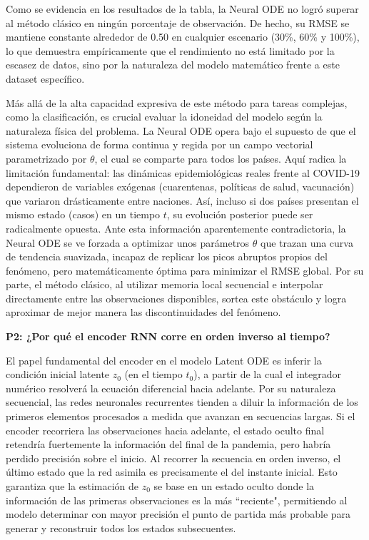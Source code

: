 \documentclass[12pt]{article}
\begin{document}
Como se evidencia en los resultados de la tabla, la Neural ODE no logró superar al método clásico en ningún porcentaje de observación. De hecho, su RMSE se mantiene constante alrededor de 0.50 en cualquier escenario (30\%, 60\% y 100\%), lo que demuestra empíricamente que el rendimiento no está limitado por la escasez de datos, sino por la naturaleza del modelo matemático frente a este dataset específico.

Más allá de la alta capacidad expresiva de este método para tareas complejas, como la clasificación, es crucial evaluar la idoneidad del modelo según la naturaleza física del problema. La Neural ODE opera bajo el supuesto de que el sistema evoluciona de forma continua y regida por un campo vectorial parametrizado por $\theta$, el cual se comparte para todos los países. Aquí radica la limitación fundamental: las dinámicas epidemiológicas reales frente al COVID-19 dependieron de variables exógenas (cuarentenas, políticas de salud, vacunación) que variaron drásticamente entre naciones. Así, incluso si dos países presentan el mismo estado (casos) en un tiempo $t$, su evolución posterior puede ser radicalmente opuesta. Ante esta información aparentemente contradictoria, la Neural ODE se ve forzada a optimizar unos parámetros $\theta$ que trazan una curva de tendencia suavizada, incapaz de replicar los picos abruptos propios del fenómeno, pero matemáticamente óptima para minimizar el RMSE global. Por su parte, el método clásico, al utilizar memoria local secuencial e interpolar directamente entre las observaciones disponibles, sortea este obstáculo y logra aproximar de mejor manera las discontinuidades del fenómeno.

\textbf{P2: ¿Por qué el encoder RNN corre en orden inverso al tiempo?}

El papel fundamental del encoder en el modelo Latent ODE es inferir la condición inicial latente $z_0$ (en el tiempo $t_0$), a partir de la cual el integrador numérico resolverá la ecuación diferencial hacia adelante. Por su naturaleza secuencial, las redes neuronales recurrentes tienden a diluir la información de los primeros elementos procesados a medida que avanzan en secuencias largas. Si el encoder recorriera las observaciones hacia adelante, el estado oculto final retendría fuertemente la información del final de la pandemia, pero habría perdido precisión sobre el inicio. Al recorrer la secuencia en orden inverso, el último estado que la red asimila es precisamente el del instante inicial. Esto garantiza que la estimación de $z_0$ se base en un estado oculto donde la información de las primeras observaciones es la más ``reciente", permitiendo al modelo determinar con mayor precisión el punto de partida más probable para generar y reconstruir todos los estados subsecuentes.
\end{document}
